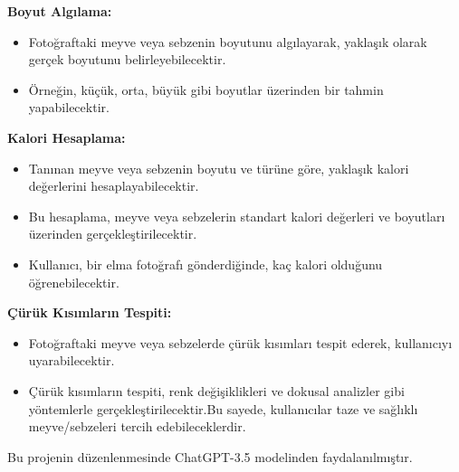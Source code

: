 \documentclass[11pt,a4paper]{report}
\begin{document}
    
    \textbf{Boyut Algılama:} 
    \begin{itemize}
      \item Fotoğraftaki meyve veya sebzenin boyutunu algılayarak, yaklaşık olarak gerçek boyutunu belirleyebilecektir.
      \item Örneğin, küçük, orta, büyük gibi boyutlar üzerinden bir tahmin yapabilecektir.
    \end{itemize}
    
    \textbf{Kalori Hesaplama:}
    \begin{itemize}
      \item Tanınan meyve veya sebzenin boyutu ve türüne göre, yaklaşık kalori değerlerini hesaplayabilecektir.
     \item  Bu hesaplama, meyve veya sebzelerin standart kalori değerleri ve boyutları üzerinden gerçekleştirilecektir.
      \item Kullanıcı, bir elma fotoğrafı gönderdiğinde, kaç kalori olduğunu öğrenebilecektir.
    \end{itemize}
    
    \textbf{Çürük Kısımların Tespiti:}
    \begin{itemize}
      \item Fotoğraftaki meyve veya sebzelerde çürük kısımları tespit ederek, kullanıcıyı uyarabilecektir.
      \item Çürük kısımların tespiti, renk değişiklikleri ve dokusal analizler gibi yöntemlerle gerçekleştirilecektir.Bu sayede, kullanıcılar taze ve sağlıklı meyve/sebzeleri tercih edebileceklerdir.\newline
      
   \end{itemize}
   
   \newpage
   
   
   Bu projenin düzenlenmesinde ChatGPT-3.5 modelinden faydalanılmıştır\cite{chatGPT}.
	
	
	
\end{document}
